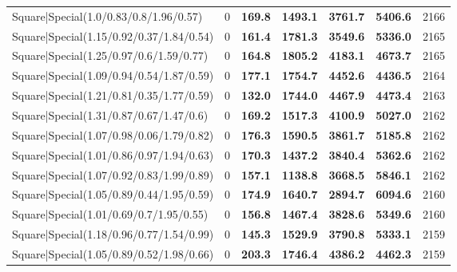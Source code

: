\begin{tabular}{lrllllr}
 Square|Special(1.0/0.83/0.8/1.96/0.57)                        &             0   & \textbf{169.8} & \textbf{1493.1} & \textbf{3761.7} & \textbf{5406.6} &         2166 \\
 Square|Special(1.15/0.92/0.37/1.84/0.54)                      &             0   & \textbf{161.4} & \textbf{1781.3} & \textbf{3549.6} & \textbf{5336.0} &         2165 \\
 Square|Special(1.25/0.97/0.6/1.59/0.77)                       &             0   & \textbf{164.8} & \textbf{1805.2} & \textbf{4183.1} & \textbf{4673.7} &         2165 \\
 Square|Special(1.09/0.94/0.54/1.87/0.59)                      &             0   & \textbf{177.1} & \textbf{1754.7} & \textbf{4452.6} & \textbf{4436.5} &         2164 \\
 Square|Special(1.21/0.81/0.35/1.77/0.59)                      &             0   & \textbf{132.0} & \textbf{1744.0} & \textbf{4467.9} & \textbf{4473.4} &         2163 \\
 Square|Special(1.31/0.87/0.67/1.47/0.6)                       &             0   & \textbf{169.2} & \textbf{1517.3} & \textbf{4100.9} & \textbf{5027.0} &         2162 \\
 Square|Special(1.07/0.98/0.06/1.79/0.82)                      &             0   & \textbf{176.3} & \textbf{1590.5} & \textbf{3861.7} & \textbf{5185.8} &         2162 \\
 Square|Special(1.01/0.86/0.97/1.94/0.63)                      &             0   & \textbf{170.3} & \textbf{1437.2} & \textbf{3840.4} & \textbf{5362.6} &         2162 \\
 Square|Special(1.07/0.92/0.83/1.99/0.89)                      &             0   & \textbf{157.1} & \textbf{1138.8} & \textbf{3668.5} & \textbf{5846.1} &         2162 \\
 Square|Special(1.05/0.89/0.44/1.95/0.59)                      &             0   & \textbf{174.9} & \textbf{1640.7} & \textbf{2894.7} & \textbf{6094.6} &         2160 \\
 Square|Special(1.01/0.69/0.7/1.95/0.55)                       &             0   & \textbf{156.8} & \textbf{1467.4} & \textbf{3828.6} & \textbf{5349.6} &         2160 \\
 Square|Special(1.18/0.96/0.77/1.54/0.99)                      &             0   & \textbf{145.3} & \textbf{1529.9} & \textbf{3790.8} & \textbf{5333.1} &         2159 \\
 Square|Special(1.05/0.89/0.52/1.98/0.66)                      &             0   & \textbf{203.3} & \textbf{1746.4} & \textbf{4386.2} & \textbf{4462.3} &         2159 \\

\end{tabular}
